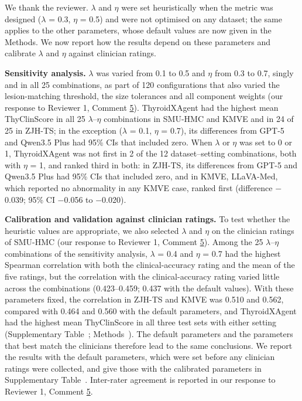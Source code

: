 We thank the reviewer. $\lambda$ and $\eta$ were set heuristically when the metric was designed ($\lambda$ = 0.3, $\eta$ = 0.5) and were not optimised on any dataset; the same applies to the other parameters, whose default values are now given in the Methods. We now report how the results depend on these parameters and calibrate $\lambda$ and $\eta$ against clinician ratings.\par

\textbf{Sensitivity analysis.} $\lambda$ was varied from 0.1 to 0.5 and $\eta$ from 0.3 to 0.7, singly and in all 25 combinations, as part of 120 configurations that also varied the lesion-matching threshold, the size tolerances and all component weights (our response to Reviewer 1, Comment \hyperref[rev:R1.5]{5}). ThyroidXAgent had the highest mean ThyClinScore in all 25 $\lambda$--$\eta$ combinations in SMU-HMC and KMVE and in 24 of 25 in ZJH-TS; in the exception ($\lambda$ = 0.1, $\eta$ = 0.7), its differences from GPT-5 and Qwen3.5 Plus had 95\% CIs that included zero. When $\lambda$ or $\eta$ was set to 0 or 1, ThyroidXAgent was not first in 2 of the 12 dataset--setting combinations, both with $\eta$ = 1, and ranked third in both: in ZJH-TS, its differences from GPT-5 and Qwen3.5 Plus had 95\% CIs that included zero, and in KMVE, LLaVA-Med, which reported no abnormality in any KMVE case, ranked first (difference $-$0.039; 95\% CI $-$0.056 to $-$0.020).\par

\textbf{Calibration and validation against clinician ratings.} To test whether the heuristic values are appropriate, we also selected $\lambda$ and $\eta$ on the clinician ratings of SMU-HMC (our response to Reviewer 1, Comment \hyperref[rev:R1.5]{5}). Among the 25 $\lambda$--$\eta$ combinations of the sensitivity analysis, $\lambda$ = 0.4 and $\eta$ = 0.7 had the highest Spearman correlation with both the clinical-accuracy rating and the mean of the five ratings, but the correlation with the clinical-accuracy rating varied little across the combinations (0.423--0.459; 0.437 with the default values). With these parameters fixed, the correlation in ZJH-TS and KMVE was 0.510 and 0.562, compared with 0.464 and 0.560 with the default parameters, and ThyroidXAgent had the highest mean ThyClinScore in all three test sets with either setting (Supplementary Table~\SuppTabClinVal{}; Methods~\SecMethThyClin{}). The default parameters and the parameters that best match the clinicians therefore lead to the same conclusions. We report the results with the default parameters, which were set before any clinician ratings were collected, and give those with the calibrated parameters in Supplementary Table~\SuppTabClinVal{}. Inter-rater agreement is reported in our response to Reviewer 1, Comment \hyperref[rev:R1.5]{5}.\par

